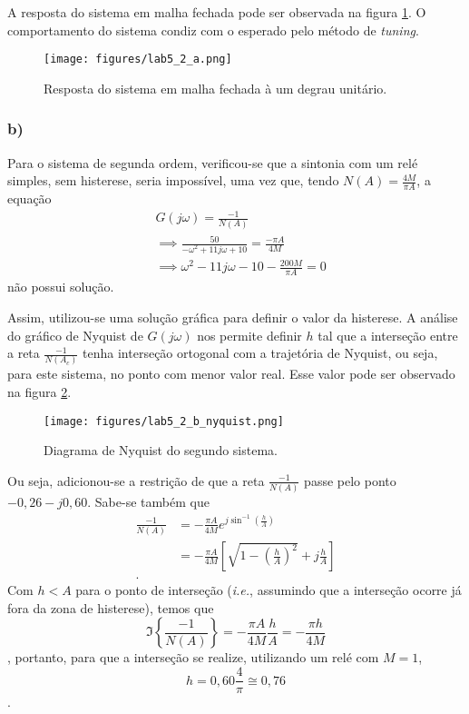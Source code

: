 \documentclass[a4paper]{report}
\begin{document}
A resposta do sistema em malha fechada pode ser observada na figura \ref{fig:figures-lab5_2_a-png}. O comportamento do sistema condiz com o esperado pelo método de \emph{tuning}.

\begin{figure}[H]
    \centering
    \texttt{[image: figures/lab5\_2\_a.png]}
    \caption{Resposta do sistema em malha fechada à um degrau unitário.}
    \label{fig:figures-lab5_2_a-png}
\end{figure}

\subsubsection*{b)}

Para o sistema de segunda ordem, verificou-se que a sintonia com um relé simples, sem histerese, seria impossível, uma vez que, tendo $N(A) = \frac{4M}{\pi A}$, a equação
\begin{align*}
    &G\left( j\omega \right) = \frac{-1}{N(A)} \\
    &\implies \frac{50}{-\omega^2 + 11j\omega + 10} = \frac{-\pi A}{4M} \\
    &\implies \omega^2 - 11j\omega -10 -\frac{200M}{\pi A} = 0
\end{align*}
não possui solução.

Assim, utilizou-se uma solução gráfica para definir o valor da histerese. A análise do gráfico de Nyquist de $G(j\omega)$ nos permite definir $h$ tal que a interseção entre a reta $\frac{-1}{N(A_c)}$ tenha interseção ortogonal com a trajetória de Nyquist, ou seja, para este sistema, no ponto com menor valor real. Esse valor pode ser observado na figura \ref{fig:figures-lab5_2_b_nyquist-png}.

\begin{figure}[H]
    \centering
    \texttt{[image: figures/lab5\_2\_b\_nyquist.png]}
    \caption{Diagrama de Nyquist do segundo sistema.}
    \label{fig:figures-lab5_2_b_nyquist-png}
\end{figure}

Ou seja, adicionou-se a restrição de que a reta $\frac{-1}{N(A)}$ passe pelo ponto $-0,26 - j0,60$. Sabe-se também que
\begin{align*}
    \frac{-1}{N(A)} &= -\frac{\pi A}{4M}e^{j\sin^{-1}\left( \frac{h}{A} \right) } \\
		    &= -\frac{\pi A}{4M}\left[\sqrt{1-\left( \frac{h}{A} \right)^2 } + j\frac{h}{A}  \right] \\
.\end{align*}
Com $h<A$ para o ponto de interseção (\emph{i.e.}, assumindo que a interseção ocorre já fora da zona de histerese), temos que \[
    \Im\left\{  \frac{-1}{N(A)}\right\} = -\frac{\pi A}{4M}\frac{h}{A} = -\frac{\pi h}{4M}
\], portanto, para que a interseção se realize, utilizando um relé com $M=1$, \[
h= 0,60 \frac{4}{\pi} \cong 0,76
\].
\end{document}
